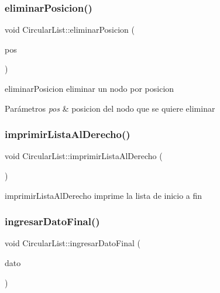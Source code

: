 \subsubsection{\texorpdfstring{eliminar\+Posicion()}{eliminarPosicion()}}
{\footnotesize\ttfamily void Circular\+List\+::eliminar\+Posicion (\begin{DoxyParamCaption}\item[{int}]{pos }\end{DoxyParamCaption})\hspace{0.3cm}{\ttfamily [inline]}}



eliminar\+Posicion eliminar un nodo por posicion 


\begin{DoxyParams}{Parámetros}
{\em pos} & posicion del nodo que se quiere eliminar \\
\hline
\end{DoxyParams}
\mbox{\label{class_circular_list_a731a6238e742307bcd2734ba90ec360f}} 
\subsubsection{\texorpdfstring{imprimir\+Lista\+Al\+Derecho()}{imprimirListaAlDerecho()}}
{\footnotesize\ttfamily void Circular\+List\+::imprimir\+Lista\+Al\+Derecho (\begin{DoxyParamCaption}{ }\end{DoxyParamCaption})\hspace{0.3cm}{\ttfamily [inline]}}



imprimir\+Lista\+Al\+Derecho imprime la lista de inicio a fin 

\mbox{\label{class_circular_list_a4d9c44a0352121d91be126746b48408f}} 
\subsubsection{\texorpdfstring{ingresar\+Dato\+Final()}{ingresarDatoFinal()}}
{\footnotesize\ttfamily void Circular\+List\+::ingresar\+Dato\+Final (\begin{DoxyParamCaption}\item[{Q\+String}]{dato }\end{DoxyParamCaption})\hspace{0.3cm}{\ttfamily [inline]}}



